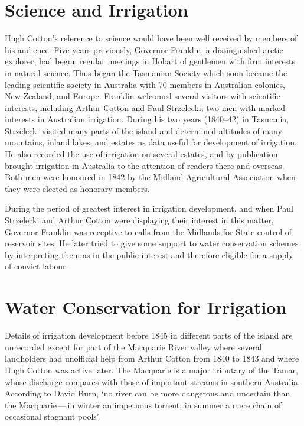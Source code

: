 \section*{Science and Irrigation}

Hugh Cotton's reference to science would have been well received by
members of his audience.  Five years previously, Governor
Franklin, a distinguished arctic explorer,
had begun regular meetings in Hobart of gentlemen with firm interests
in natural science.  Thus began the Tasmanian
Society which soon became the leading scientific society in Australia
with 70 members in Australian colonies, New Zealand, and Europe.
Franklin welcomed several visitors with scientific interests,
including Arthur Cotton and Paul
Strzelecki, two men with marked interests in
Australian irrigation.  During his two years (1840--42) in Tasmania,
Strzelecki visited many parts of the island and determined altitudes
of many mountains, inland lakes, and estates as data useful for
development of irrigation.  He also recorded the use of irrigation on
several estates, and by publication brought irrigation in Australia to
the attention of readers there and overseas.  Both men were honoured
in 1842 by the Midland Agricultural Association when they were elected
as honorary members.

During the period of greatest interest in irrigation development, and
when Paul Strzelecki and Arthur Cotton were displaying their interest
in this matter, Governor Franklin was receptive to calls from the
Midlands for State control of reservoir
sites. He later tried to give some support to water conservation
schemes by interpreting them as in the public interest and therefore
eligible for a supply of convict labour.

\section*{Water Conservation for Irrigation}

Details of irrigation development before 1845 in different parts of
the island are unrecorded except for part of the Macquarie
River valley where several landholders had
unofficial help from Arthur Cotton from 1840 to 1843 and where Hugh
Cotton was active later.  The Macquarie is a major tributary of the
Tamar, whose discharge compares with those of
important streams in southern Australia. According to David Burn, `no
river can be more dangerous and uncertain than the Macquarie\,---\,in
winter an impetuous torrent; in summer a mere chain of occasional
stagnant pools'.

